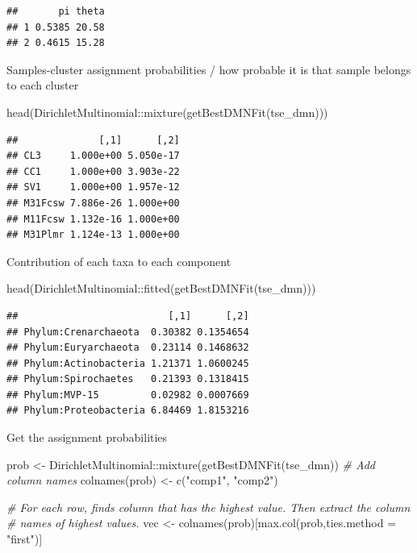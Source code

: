 \documentclass[
]{book}
\newenvironment{Shaded}{\begin{snugshade}}{\end{snugshade}}
\newcommand{\AttributeTok}[1]{\textcolor[rgb]{0.77,0.63,0.00}{#1}}
\newcommand{\CommentTok}[1]{\textcolor[rgb]{0.56,0.35,0.01}{\textit{#1}}}
\newcommand{\FunctionTok}[1]{\textcolor[rgb]{0.00,0.00,0.00}{#1}}
\newcommand{\NormalTok}[1]{#1}
\newcommand{\OtherTok}[1]{\textcolor[rgb]{0.56,0.35,0.01}{#1}}
\newcommand{\SpecialCharTok}[1]{\textcolor[rgb]{0.00,0.00,0.00}{#1}}
\newcommand{\StringTok}[1]{\textcolor[rgb]{0.31,0.60,0.02}{#1}}
\begin{document}
\begin{verbatim}
##       pi theta
## 1 0.5385 20.58
## 2 0.4615 15.28
\end{verbatim}

Samples-cluster assignment probabilities / how probable it is that sample belongs
to each cluster

\begin{Shaded}
\begin{Highlighting}[]
\FunctionTok{head}\NormalTok{(DirichletMultinomial}\SpecialCharTok{::}\FunctionTok{mixture}\NormalTok{(}\FunctionTok{getBestDMNFit}\NormalTok{(tse\_dmn)))}
\end{Highlighting}
\end{Shaded}

\begin{verbatim}
##              [,1]      [,2]
## CL3     1.000e+00 5.050e-17
## CC1     1.000e+00 3.903e-22
## SV1     1.000e+00 1.957e-12
## M31Fcsw 7.886e-26 1.000e+00
## M11Fcsw 1.132e-16 1.000e+00
## M31Plmr 1.124e-13 1.000e+00
\end{verbatim}

Contribution of each taxa to each component

\begin{Shaded}
\begin{Highlighting}[]
\FunctionTok{head}\NormalTok{(DirichletMultinomial}\SpecialCharTok{::}\FunctionTok{fitted}\NormalTok{(}\FunctionTok{getBestDMNFit}\NormalTok{(tse\_dmn)))}
\end{Highlighting}
\end{Shaded}

\begin{verbatim}
##                          [,1]      [,2]
## Phylum:Crenarchaeota  0.30382 0.1354654
## Phylum:Euryarchaeota  0.23114 0.1468632
## Phylum:Actinobacteria 1.21371 1.0600245
## Phylum:Spirochaetes   0.21393 0.1318415
## Phylum:MVP-15         0.02982 0.0007669
## Phylum:Proteobacteria 6.84469 1.8153216
\end{verbatim}

Get the assignment probabilities

\begin{Shaded}
\begin{Highlighting}[]
\NormalTok{prob }\OtherTok{\textless{}{-}}\NormalTok{ DirichletMultinomial}\SpecialCharTok{::}\FunctionTok{mixture}\NormalTok{(}\FunctionTok{getBestDMNFit}\NormalTok{(tse\_dmn))}
\CommentTok{\# Add column names}
\FunctionTok{colnames}\NormalTok{(prob) }\OtherTok{\textless{}{-}} \FunctionTok{c}\NormalTok{(}\StringTok{"comp1"}\NormalTok{, }\StringTok{"comp2"}\NormalTok{)}

\CommentTok{\# For each row, finds column that has the highest value. Then extract the column }
\CommentTok{\# names of highest values.}
\NormalTok{vec }\OtherTok{\textless{}{-}} \FunctionTok{colnames}\NormalTok{(prob)[}\FunctionTok{max.col}\NormalTok{(prob,}\AttributeTok{ties.method =} \StringTok{"first"}\NormalTok{)]}
\end{Highlighting}
\end{Shaded}
\end{document}
